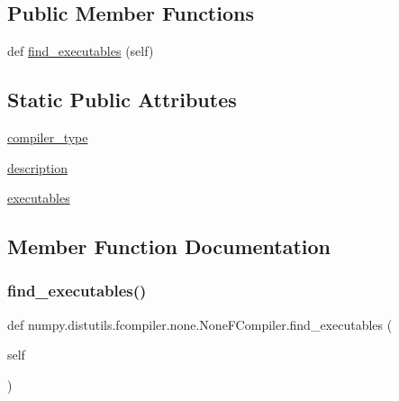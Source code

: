 \subsection*{Public Member Functions}
\begin{DoxyCompactItemize}
\item 
def \hyperlink{classnumpy_1_1distutils_1_1fcompiler_1_1none_1_1NoneFCompiler_aecbb691109e4f914b2e116a8d3283be2}{find\+\_\+executables} (self)
\end{DoxyCompactItemize}
\subsection*{Static Public Attributes}
\begin{DoxyCompactItemize}
\item 
\hyperlink{classnumpy_1_1distutils_1_1fcompiler_1_1none_1_1NoneFCompiler_ac7ce987e8670c5b4a21de8fc26ca0b31}{compiler\+\_\+type}
\item 
\hyperlink{classnumpy_1_1distutils_1_1fcompiler_1_1none_1_1NoneFCompiler_a9d8754595eb1493e163fb4405a66c7ae}{description}
\item 
\hyperlink{classnumpy_1_1distutils_1_1fcompiler_1_1none_1_1NoneFCompiler_a2b02e16ce32dfdd29080c244c7c4878e}{executables}
\end{DoxyCompactItemize}


\subsection{Member Function Documentation}
\mbox{\label{classnumpy_1_1distutils_1_1fcompiler_1_1none_1_1NoneFCompiler_aecbb691109e4f914b2e116a8d3283be2}} 
\subsubsection{\texorpdfstring{find\+\_\+executables()}{find\_executables()}}
{\footnotesize\ttfamily def numpy.\+distutils.\+fcompiler.\+none.\+None\+F\+Compiler.\+find\+\_\+executables (\begin{DoxyParamCaption}\item[{}]{self }\end{DoxyParamCaption})}



